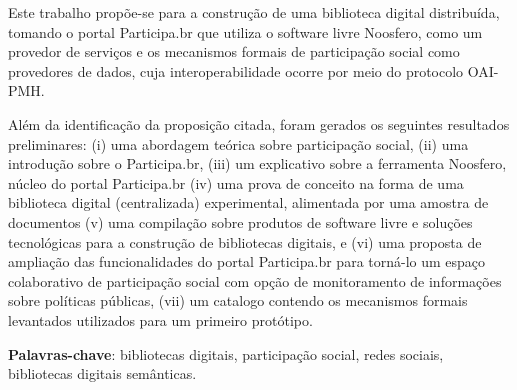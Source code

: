 \begin{resumo}

Este trabalho propõe-se para a construção de uma biblioteca digital distribuída, tomando o portal Participa.br que utiliza o software livre Noosfero, como um provedor de serviços e os mecanismos formais de participação social como provedores de dados, cuja interoperabilidade ocorre por meio do protocolo OAI-PMH.

Além da identificação da proposição citada, foram gerados os seguintes resultados preliminares: (i) uma abordagem teórica sobre participação social, (ii) uma introdução sobre o Participa.br, (iii) um explicativo sobre a ferramenta Noosfero, núcleo do portal Participa.br (iv) uma prova de conceito na forma de uma biblioteca digital (centralizada) experimental, alimentada por uma amostra de documentos (v) uma compilação sobre produtos de software livre e soluções tecnológicas para a construção de bibliotecas digitais, e (vi) uma proposta de ampliação das funcionalidades do portal Participa.br para torná-lo um espaço colaborativo de participação social com opção de monitoramento de informações sobre políticas públicas, (vii) um catalogo contendo os mecanismos formais levantados utilizados para um primeiro protótipo.


\textbf{Palavras-chave}: bibliotecas digitais, participação social, redes sociais, bibliotecas digitais semânticas.

\end{resumo}

